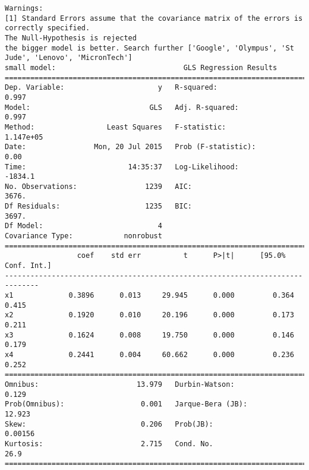 \documentclass{article}
\begin{document}
\begin{verbatim}
Warnings:
[1] Standard Errors assume that the covariance matrix of the errors is correctly specified.
The Null-Hypothesis is rejected
the bigger model is better. Search further ['Google', 'Olympus', 'St Jude', 'Lenovo', 'MicronTech']
small model:                              GLS Regression Results                            
==============================================================================
Dep. Variable:                      y   R-squared:                       0.997
Model:                            GLS   Adj. R-squared:                  0.997
Method:                 Least Squares   F-statistic:                 1.147e+05
Date:                Mon, 20 Jul 2015   Prob (F-statistic):               0.00
Time:                        14:35:37   Log-Likelihood:                -1834.1
No. Observations:                1239   AIC:                             3676.
Df Residuals:                    1235   BIC:                             3697.
Df Model:                           4                                         
Covariance Type:            nonrobust                                         
==============================================================================
                 coef    std err          t      P>|t|      [95.0% Conf. Int.]
------------------------------------------------------------------------------
x1             0.3896      0.013     29.945      0.000         0.364     0.415
x2             0.1920      0.010     20.196      0.000         0.173     0.211
x3             0.1624      0.008     19.750      0.000         0.146     0.179
x4             0.2441      0.004     60.662      0.000         0.236     0.252
==============================================================================
Omnibus:                       13.979   Durbin-Watson:                   0.129
Prob(Omnibus):                  0.001   Jarque-Bera (JB):               12.923
Skew:                           0.206   Prob(JB):                      0.00156
Kurtosis:                       2.715   Cond. No.                         26.9
==============================================================================


\end{verbatim}
\end{document}
